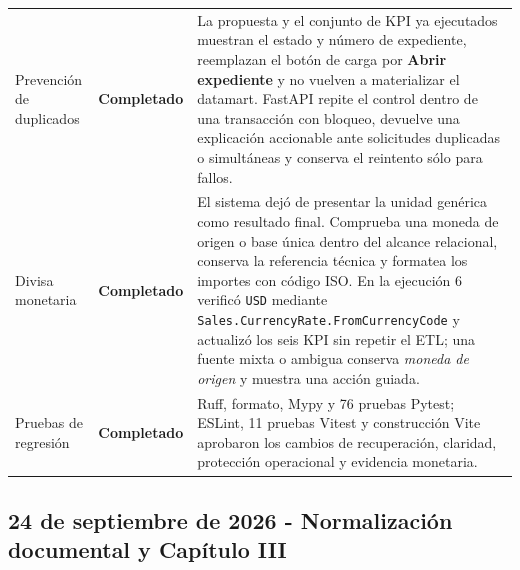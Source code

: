\documentclass[11pt,letterpaper]{article}
\newcommand{\statusok}{\textcolor{deepgreen}{\textbf{Completado}}}
\newcommand{\file}[1]{\texttt{#1}}
\begin{document}
\begin{longtable}{@{}p{}p{}p{}@{}}
  Prevención de duplicados & \statusok & La propuesta y el conjunto de KPI ya ejecutados muestran el estado y número de expediente, reemplazan el botón de carga por \textbf{Abrir expediente} y no vuelven a materializar el datamart. FastAPI repite el control dentro de una transacción con bloqueo, devuelve una explicación accionable ante solicitudes duplicadas o simultáneas y conserva el reintento sólo para fallos. \\
  Divisa monetaria & \statusok & El sistema dejó de presentar la unidad genérica como resultado final. Comprueba una moneda de origen o base única dentro del alcance relacional, conserva la referencia técnica y formatea los importes con código ISO. En la ejecución 6 verificó \file{USD} mediante \file{Sales.CurrencyRate.FromCurrencyCode} y actualizó los seis KPI sin repetir el ETL; una fuente mixta o ambigua conserva \textit{moneda de origen} y muestra una acción guiada. \\
  Pruebas de regresión & \statusok & Ruff, formato, Mypy y 76 pruebas Pytest; ESLint, 11 pruebas Vitest y construcción Vite aprobaron los cambios de recuperación, claridad, protección operacional y evidencia monetaria. \\
  \bottomrule
\end{longtable}

\subsection{24 de septiembre de 2026 - Normalización documental y Capítulo III}
\end{document}
